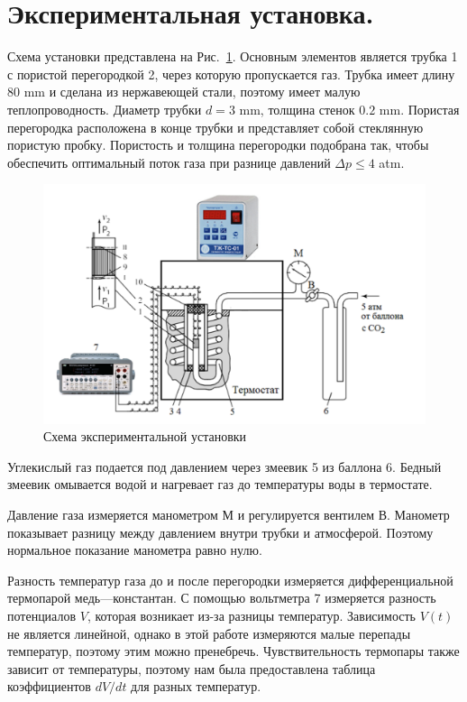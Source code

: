 \documentclass[a4paper,12pt]{report}
\begin{document}
    \section{Экспериментальная установка.}
        Схема установки представлена на Рис.~\ref{fig:1}. Основным элементов является трубка 1 с пористой перегородкой 2, через которую пропускается газ. Трубка имеет длину 80 mm и сделана из нержавеющей стали, поэтому имеет малую теплопроводность. Диаметр трубки $d=3$ mm, толщина стенок $0.2$ mm. Пористая перегородка расположена в конце трубки и представляет собой стеклянную пористую пробку. Пористость и толщина перегородки подобрана так, чтобы обеспечить оптимальный поток газа при разнице давлений $\Delta p \leq 4$ atm.
        \begin{figure}[H]
            \includegraphics[width=0.9\linewidth]{img/ustanovka.png}
            \caption{Схема экспериментальной установки}
            \label{fig:1}
        \end{figure}
        Углекислый газ подается под давлением через змеевик 5 из баллона 6. Бедный змеевик омывается водой и нагревает газ до температуры воды в термостате.

        Давление газа измеряется манометром М и регулируется вентилем В. Манометр показывает разницу между давлением внутри трубки и атмосферой. Поэтому нормальное показание манометра равно нулю.

        Разность температур газа до и после перегородки измеряется дифференциальной термопарой медь---константан. С помощью вольтметра 7 измеряется разность потенциалов $V$, которая возникает из-за разницы температур. Зависимость $V(t)$ не является линейной, однако в этой работе измеряются малые перепады температур, поэтому этим можно пренебречь. Чувствительность термопары также зависит от температуры, поэтому нам была предоставлена таблица коэффициентов $dV/dt$ для разных температур.
    
\end{document}
